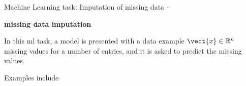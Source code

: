 
\begin{frame}[t,allowframebreaks]{
    Machine Learning task: Imputation of missing data - }

    {\bf {}\Gls{missing data imputation}} \\
    \vspace{0.1cm}
    \begin{itemize}
        {
            \item
            In this \gls{ml} task, a model is presented with a data example
            $\vect{x} \in \mathbb{R}^n$ missing values for a number of entries,
            and it is asked to predict the missing values.\\
            \vspace{0.1cm}
            \item
            Examples include \\
        }
    \end{itemize}


\end{frame}